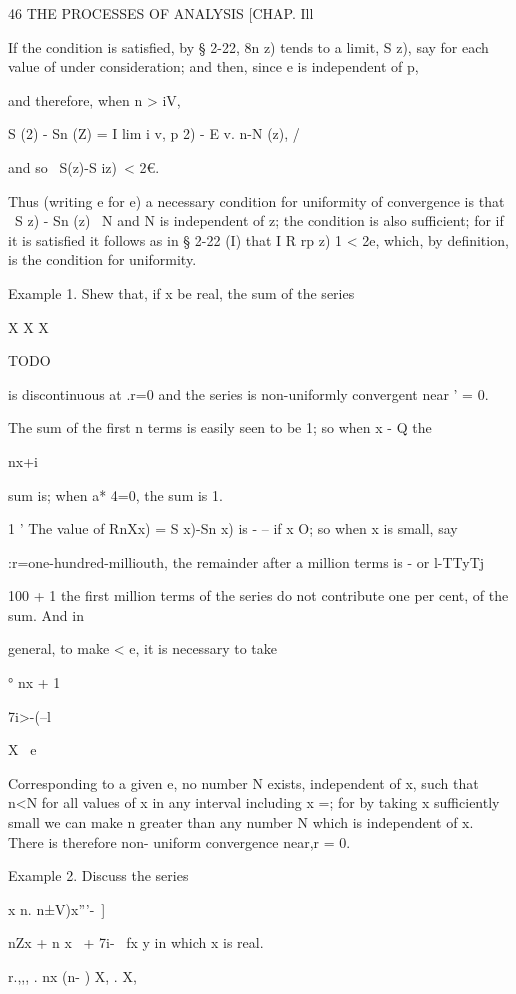 46 THE PROCESSES OF ANALYSIS [CHAP. Ill

If the condition is satisfied, by § 2-22, 8n z) tends to a limit, S
z), say for each value of under consideration; and then, since e is
independent of p,

and therefore, when n > iV,

S (2) - Sn (Z) = I lim i v, p 2) - E v. n-N (z), /

and so \ S(z)-S iz)\ < 2€.

Thus (writing e for e) a necessary condition for uniformity of
convergence is that \ S z) - Sn (z) \ < e, whenever n>N and N is
independent of z; the condition is also sufficient; for if it is
satisfied it follows as in § 2-22 (I) that I R rp z) 1 < 2e, which, by
definition, is the condition for uniformity.

Example 1. Shew that, if x be real, the sum of the series

X X X

TODO

is discontinuous at .r=0 and the series is non-uniformly convergent
near ' = 0.

The sum of the first n terms is easily seen to be 1; so when x - Q
the

nx+i

sum is; when a* 4=0, the sum is 1.

1 ' The value of RnXx) = S x)-Sn x) is - -- if x O; so when x is
small, say

:r=one-hundred-milliouth, the remainder after a million terms is - or
l-TTyTj

100 + 1 the first million terms of the series do not contribute one
per cent, of the sum. And in

general, to make < e, it is necessary to take

° nx + 1

7i>-(--l

X \ e

Corresponding to a given e, no number N exists, independent of x, such
that n<N for all values of x in any interval including x =; for by
taking x sufficiently small we can make n greater than any number N
which is independent of x. There is therefore non- uniform convergence
near,r = 0.

Example 2. Discuss the series

x n. n±V)x'''-\ ]



nZx + n x \ + 7i- \ fx y in which x is real.

r.,,, . nx (n- ) X, . X,

